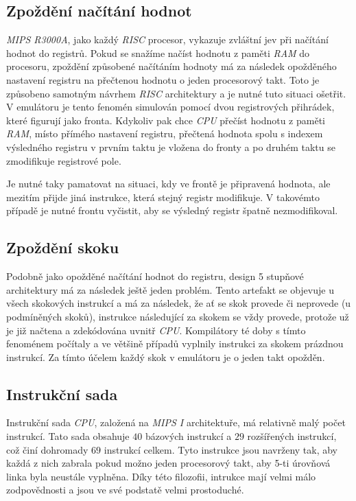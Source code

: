 \subsection{Zpoždění načítání hodnot}

\textit{MIPS R3000A}, jako každý \textit{RISC} procesor, vykazuje zvláštní jev při načítání hodnot do registrů.
Pokud se snažíme načíst hodnotu z paměti \textit{RAM} do procesoru, zpoždění způsobené načítáním hodnoty má za následek
opožděného nastavení registru na přečtenou hodnotu o jeden procesorový takt. 
Toto je způsobeno samotným návrhem \textit{RISC} architektury a je nutné tuto situaci ošetřit. 
V emulátoru je tento fenomén simulován pomocí dvou registrových přihrádek, které figurují jako fronta.
Kdykoliv pak chce \textit{CPU} přečíst hodnotu z paměti \textit{RAM}, místo přímého nastavení registru,
přečtená hodnota spolu s indexem výsledného registru v prvním taktu je vložena do fronty a po druhém taktu se 
zmodifikuje registrové pole.

Je nutné taky pamatovat na situaci, kdy ve frontě je připravená hodnota, ale mezitím přijde jiná instrukce, 
která stejný registr modifikuje. V takovémto případě je nutné frontu vyčistit, aby se výsledný registr špatně
nezmodifikoval.

\subsection{Zpoždění skoku}

Podobně jako opožděné načítání hodnot do registru, design 5 stupňové architektury má za následek ještě jeden problém.
Tento artefakt se objevuje u všech skokových instrukcí a má za následek, že ať se skok provede či neprovede (u podmíněných skoků),
instrukce následující za skokem se vždy provede, protože už je již načtena a zdekódována uvnitř \textit{CPU}. 
Kompilátory té doby s tímto fenoménem počítaly a ve většině případů vyplnily instrukci za skokem prázdnou instrukcí.
Za tímto účelem každý skok v emulátoru je o jeden takt opožděn.

\subsection{Instrukční sada}

Instrukční sada \textit{CPU}, založená na \textit{MIPS I} architektuře, má relativně malý počet instrukcí.
Tato sada obsahuje $40$ bázových instrukcí a $29$ rozšířených instrukcí, což činí dohromady $69$ instrukcí celkem.
Tyto instrukce jsou navrženy tak, aby každá z nich zabrala pokud možno jeden procesorový takt, aby 5-ti úrovňová
linka byla neustále vyplněna. Díky této filozofii, intrukce mají velmi málo zodpovědnosti a jsou ve své podstatě
velmi prostoduché.

